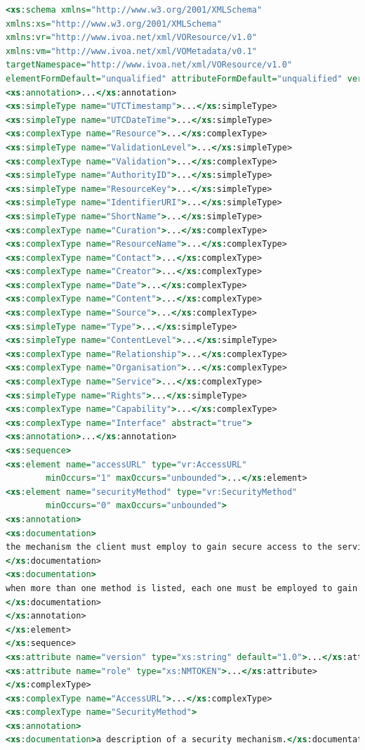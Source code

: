 \documentclass[11pt,a4paper]{ivoa}
\begin{document}
\begin{lstlisting}[language=XSLT]
<xs:schema xmlns="http://www.w3.org/2001/XMLSchema" 
xmlns:xs="http://www.w3.org/2001/XMLSchema" 
xmlns:vr="http://www.ivoa.net/xml/VOResource/v1.0" 
xmlns:vm="http://www.ivoa.net/xml/VOMetadata/v0.1" 
targetNamespace="http://www.ivoa.net/xml/VOResource/v1.0" 
elementFormDefault="unqualified" attributeFormDefault="unqualified" version="1.02">
<xs:annotation>...</xs:annotation>
<xs:simpleType name="UTCTimestamp">...</xs:simpleType>
<xs:simpleType name="UTCDateTime">...</xs:simpleType>
<xs:complexType name="Resource">...</xs:complexType>
<xs:simpleType name="ValidationLevel">...</xs:simpleType>
<xs:complexType name="Validation">...</xs:complexType>
<xs:simpleType name="AuthorityID">...</xs:simpleType>
<xs:simpleType name="ResourceKey">...</xs:simpleType>
<xs:simpleType name="IdentifierURI">...</xs:simpleType>
<xs:simpleType name="ShortName">...</xs:simpleType>
<xs:complexType name="Curation">...</xs:complexType>
<xs:complexType name="ResourceName">...</xs:complexType>
<xs:complexType name="Contact">...</xs:complexType>
<xs:complexType name="Creator">...</xs:complexType>
<xs:complexType name="Date">...</xs:complexType>
<xs:complexType name="Content">...</xs:complexType>
<xs:complexType name="Source">...</xs:complexType>
<xs:simpleType name="Type">...</xs:simpleType>
<xs:simpleType name="ContentLevel">...</xs:simpleType>
<xs:complexType name="Relationship">...</xs:complexType>
<xs:complexType name="Organisation">...</xs:complexType>
<xs:complexType name="Service">...</xs:complexType>
<xs:simpleType name="Rights">...</xs:simpleType>
<xs:complexType name="Capability">...</xs:complexType>
<xs:complexType name="Interface" abstract="true">
<xs:annotation>...</xs:annotation>
<xs:sequence>
<xs:element name="accessURL" type="vr:AccessURL" 
		minOccurs="1" maxOccurs="unbounded">...</xs:element>
<xs:element name="securityMethod" type="vr:SecurityMethod" 
		minOccurs="0" maxOccurs="unbounded">
<xs:annotation>
<xs:documentation>
the mechanism the client must employ to gain secure access to the service.
</xs:documentation>
<xs:documentation>
when more than one method is listed, each one must be employed to gain access.
</xs:documentation>
</xs:annotation>
</xs:element>
</xs:sequence>
<xs:attribute name="version" type="xs:string" default="1.0">...</xs:attribute>
<xs:attribute name="role" type="xs:NMTOKEN">...</xs:attribute>
</xs:complexType>
<xs:complexType name="AccessURL">...</xs:complexType>
<xs:complexType name="SecurityMethod">
<xs:annotation>
<xs:documentation>a description of a security mechanism.</xs:documentation>

\end{lstlisting}
\end{document}
